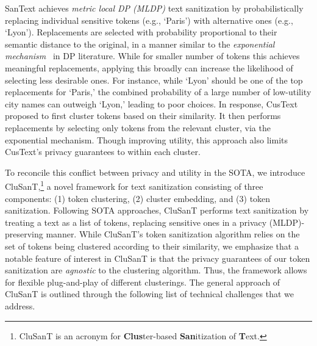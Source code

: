 \documentclass[11pt]{article}
\newcommand{\clusant}{CluSanT\xspace}
\begin{document}
SanText achieves {\em metric local DP (MLDP)} text sanitization by probabilistically replacing individual sensitive tokens (e.g., `Paris') with alternative ones (e.g., `Lyon'). Replacements are selected with probability proportional to their semantic distance to the original, in a manner similar to the {\em exponential mechanism}~\cite{mcsherry2007mechanism} in DP literature. 
While for smaller number of tokens this achieves meaningful replacements, applying this broadly can 
increase the likelihood of selecting less desirable ones. 
%
For instance, while `Lyon' should be one of the top replacements for `Paris,' the combined probability of a large number of low-utility city names can outweigh `Lyon,' leading to poor choices.
%
%
In response, CusText proposed to first cluster tokens based on their similarity. It then performs replacements by selecting only tokens from the relevant cluster, via the exponential mechanism.  
Though improving utility, this approach also limits CusText's privacy guarantees to within each cluster.


To reconcile this conflict between privacy and utility in the SOTA, we  introduce \clusant,\footnote{\clusant is an acronym for \textbf{Clus}ter-based \textbf{San}itization of \textbf{T}ext.} a novel framework for text sanitization consisting of three components: (1) token clustering, (2) cluster embedding, and (3) token sanitization. Following  SOTA approaches, \clusant performs text sanitization by treating a text as a list of tokens, replacing sensitive ones in a privacy (MLDP)-preserving manner.  %
While \clusant's token sanitization algorithm relies on the set of tokens being clustered according to their similarity, we emphasize that a notable feature of interest in \clusant is that the privacy guarantees of our token sanitization are {\em agnostic} to the clustering algorithm. 
Thus, the framework allows for flexible plug-and-play of different clusterings.
The general approach of \clusant is outlined through the following list of technical challenges that we address.
\end{document}
